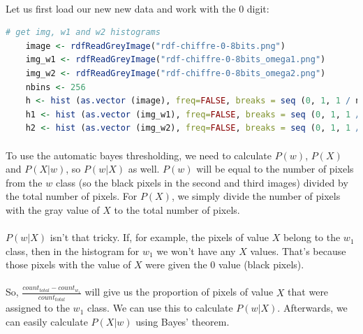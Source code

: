 \paragraph{}
Let us first load our new new data and work with the $0$ digit:
\begin{lstlisting}[language=R, caption=Loading data for digits]
    # get img, w1 and w2 histograms
    image <- rdfReadGreyImage("rdf-chiffre-0-8bits.png")
    img_w1 <- rdfReadGreyImage("rdf-chiffre-0-8bits_omega1.png")
    img_w2 <- rdfReadGreyImage("rdf-chiffre-0-8bits_omega2.png")
    nbins <- 256
    h <- hist (as.vector (image), freq=FALSE, breaks = seq (0, 1, 1 / nbins))
    h1 <- hist (as.vector (img_w1), freq=FALSE, breaks = seq (0, 1, 1 / nbins))
    h2 <- hist (as.vector (img_w2), freq=FALSE, breaks = seq (0, 1, 1 / nbins))
\end{lstlisting}

\clearpage

\paragraph{}
To use the automatic bayes thresholding, we need to calculate $P(w)$, $P(X)$ and $P(X|w)$, so $P(w|X)$ as well.
$P(w)$ will be equal to the number of pixels from the $w$ class (so the black pixels in the second and third images) divided by the total number of pixels.
For $P(X)$, we simply divide the number of pixels with the gray value of $X$ to the total number of pixels.
\paragraph{}
$P(w|X)$ isn't that tricky.
If, for example, the pixels of value $X$ belong to the $w_1$ class, then in the histogram for $w_1$ we won't have any $X$ values.
That's because those pixels with the value of $X$ were given the $0$ value (black pixels).
\paragraph{}
So, $\frac{count_{total} - count_{w_1}} {count_{total}}$ will give us the proportion of pixels of value $X$ that were assigned to the $w_1$ class.
We can use this to calculate $P(w|X)$. Afterwards, we can easily calculate $P(X|w)$ using Bayes' theorem.

